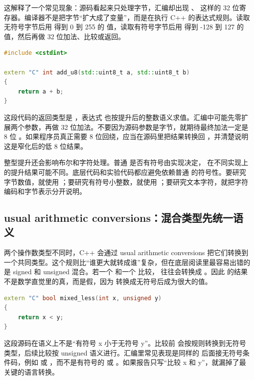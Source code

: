 这解释了一个常见现象：源码看起来只处理字节，汇编却出现 、 这样的 32 位寄存器。编译器不是把字节“扩大成了变量”，而是在执行 C++ 的表达式规则。读取无符号字节后用  得到 0 到 255 的  值，读取有符号字节后用  得到 -128 到 127 的  值，然后再做 32 位加法、比较或返回。

\begin{lstlisting}[language=C++]
#include <cstdint>

extern "C" int add_u8(std::uint8_t a, std::uint8_t b)
{
    return a + b;
}
\end{lstlisting}

这段代码的返回类型是 ，表达式  也按提升后的整数语义求值。汇编中可能先零扩展两个参数，再做 32 位加法。不要因为源码参数是字节，就期待最终加法一定是 8 位 。如果程序员真正需要 8 位回绕，应当在源码里把结果转换回 ，并清楚说明这是窄化后的低 8 位结果。

整型提升还会影响布尔和字符处理。普通  是否有符号由实现决定， 在不同实现上的提升结果可能不同。底层代码和实验代码都应避免依赖普通  的符号性。要研究字节数值，就使用 ；要研究有符号小整数，就使用 ；要研究文本字符，就把字符编码和字节表示分开说明。

\subsection{usual arithmetic conversions：混合类型先统一语义}

两个操作数类型不同时，C++ 会通过 usual arithmetic conversions 把它们转换到一个共同类型。这个规则比“谁更大就转成谁”复杂，但在底层阅读里最容易出错的是 signed 和 unsigned 混合。若一个  和一个  比较， 往往会转换成 。因此  的结果不是数学直觉里的真，而是假，因为  转换成无符号后成为很大的值。

\begin{lstlisting}[language=C++]
extern "C" bool mixed_less(int x, unsigned y)
{
    return x < y;
}
\end{lstlisting}

这段源码在语义上不是“有符号 x 小于无符号 y”。比较前  会按规则转换到无符号类型，后续比较按 unsigned 语义进行。汇编里常见表现是同样的  后面接无符号条件码，例如  或 ，而不是有符号的  或 。如果报告只写“比较 x 和 y”，就漏掉了最关键的语言转换。

